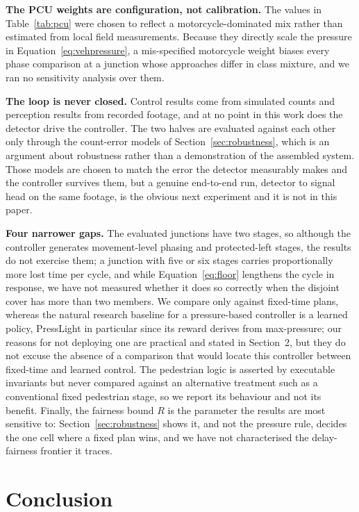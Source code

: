 \documentclass[journal]{IEEEtran}
\newcommand{\pcu}{PCU}
\begin{document}
\textbf{The \pcu{} weights are configuration, not calibration.} The values in Table~\ref{tab:pcu} were
chosen to reflect a motorcycle-dominated mix rather than estimated from local field measurements.
Because they directly scale the pressure in Equation~\eqref{eq:vehpressure}, a mis-specified motorcycle
weight biases every phase comparison at a junction whose approaches differ in class mixture, and we ran
no sensitivity analysis over them.

\textbf{The loop is never closed.} Control results come from simulated counts and perception
results from recorded footage, and at no point in this work does the detector drive the controller.
The two halves are evaluated against each other only through the count-error models of
Section~\ref{sec:robustness}, which is an argument about robustness rather than a demonstration of
the assembled system. Those models are chosen to match the error the detector measurably makes and
the controller survives them, but a genuine end-to-end run, detector to signal head on the same
footage, is the obvious next experiment and it is not in this paper.

\textbf{Four narrower gaps.} The evaluated junctions have two stages, so although the controller
generates movement-level phasing and protected-left stages, the results do not exercise them; a junction
with five or six stages carries proportionally more lost time per cycle, and while
Equation~\ref{eq:floor} lengthens the cycle in response, we have not measured whether it does so
correctly when the disjoint cover has more than two members. We compare only against fixed-time plans,
whereas the natural research baseline for a pressure-based controller is a learned policy, PressLight
\cite{wei2019presslight} in particular since its reward derives from max-pressure; our reasons for not
deploying one are practical and stated in Section~2, but they do not excuse the absence of a comparison
that would locate this controller between fixed-time and learned control. The pedestrian logic is
asserted by executable invariants but never compared against an alternative treatment such as a
conventional fixed pedestrian stage, so we report its behaviour and not its benefit. Finally, the
fairness bound $R$ is the parameter the results are most sensitive to: Section~\ref{sec:robustness}
shows it, and not the pressure rule, decides the one cell where a fixed plan wins, and we have not
characterised the delay-fairness frontier it traces.

\section{Conclusion}
\end{document}

